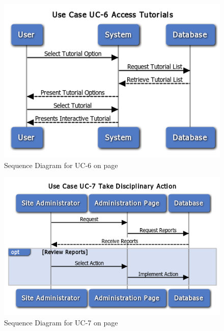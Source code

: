\begin{figure}
\centering
\includegraphics[width=5.5in]{./Diagrams/SystemSequenceDiagrams/uc6.png}
\caption{Sequence Diagram for UC-6 on page \pageref{UC-6}}
\end{figure}

\begin{figure}
\centering
\includegraphics[width=5.5in]{./Diagrams/SystemSequenceDiagrams/uc7.png}
\caption{Sequence Diagram for UC-7 on page \pageref{UC-7}}
\end{figure}
